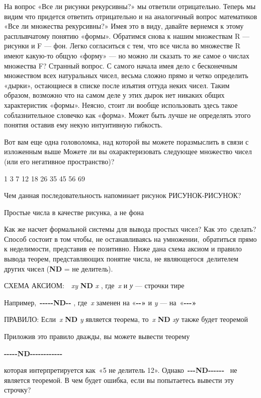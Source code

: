 На вопрос «Все ли рисунки рекурсивны?» мы ответили отрицательно. Теперь мы видим что придется ответить отрицательно и на аналогичный вопрос математиков «Все ли множества рекурсивны?» Имея это в виду, давайте вернемся к этому расплывчатому понятию «формы». Обратимся снова к нашим множествам R --- рисунки и F --- фон. Легко согласиться с тем, что все числа во множестве R имеют какую-то общую «форму» --- но можно ли сказать то же самое о числах множества F? Странный вопрос. С самого начала имея дело с бесконечным множеством всех натуральных чисел, весьма сложно прямо и четко определить «дырки», остающиеся в списке после изъятия оттуда неких чисел. Таким образом, возможно что на самом деле у этих дырок нет никаких общих характеристик «формы». Неясно, стоит ли вообще использовать здесь такое соблазнительное словечко как «форма». Может быть лучше не определять этого понятия оставив ему некую интуитивную гибкость.

Вот вам еще одна головоломка, над которой вы можете поразмыслить в связи с изложенным выше Можете ли вы охарактеризовать следующее множество чисел (или его негативное пространство)?

1 3 7 12 18 26 35 45 56 69

Чем данная последовательность напоминает рисунок РИСУНОК-РИСУНОК?

Простые числа в качестве рисунка, а не фона

Как же насчет формальной системы для вывода простых чисел? Как это~сделать? Способ состоит в том чтобы, не останавливаясь на умножении,~обратиться прямо к неделимости, представив ее позитивно. Ниже дана схема аксиом и правило вывода теорем, представляющих понятие числа, не являющегося~делителем других чисел (\textbf{ND} = не делитель).

СХЕМА АКСИОМ:~~\emph{xy} \textbf{ND} \emph{x} , где~\emph{x} и \emph{у} --- строчки тире

Например,~\textbf{-\/-\/-\/-\/-ND-\/-} , где~\emph{x} заменен на «\textbf{-\/-»} и \emph{y} --- на~«\textbf{-\/-\/-»}

ПРАВИЛО: Если~\emph{x} \textbf{ND} \emph{y} является теорема, то~\emph{x} \textbf{ND} \emph{xу} также будет теоремой

Приложив это правило дважды, вы можете вывести теорему

\textbf{-\/-\/-\/-\/-ND-\/-\/-\/-\/-\/-\/-\/-\/-\/-\/-\/-}

которая интерпретируется как~«5 не делитель 12». Однако~\textbf{-\/-\/-ND-\/-\/-\/-\/-\/-} ~не является теоремой. В чем будет ошибка, если вы попытаетесь вывести эту строчку?

